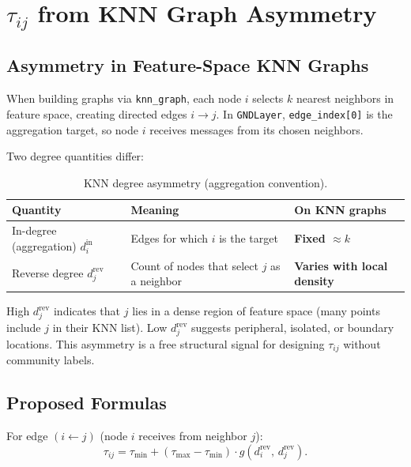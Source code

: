 \documentclass[11pt,a4paper]{report}
\begin{document}
\chapter{\texorpdfstring{$\tau_{ij}$}{tau\_ij} from KNN Graph Asymmetry}

\section{Asymmetry in Feature-Space KNN Graphs}

When building graphs via \texttt{knn\_graph}, each node $i$ selects $k$ nearest neighbors in feature space, creating directed edges $i \to j$. In \texttt{GNDLayer}, \texttt{edge\_index[0]} is the aggregation target, so node $i$ receives messages from its chosen neighbors.

Two degree quantities differ:

\begin{table}[h]
\centering
\caption{KNN degree asymmetry (aggregation convention).}
\begin{tabular}{@{}lll@{}}
\toprule
\textbf{Quantity} & \textbf{Meaning} & \textbf{On KNN graphs} \\
\midrule
In-degree (aggregation) $d^{\mathrm{in}}_i$ & Edges for which $i$ is the target & \textbf{Fixed $\approx k$} \\
Reverse degree $d^{\mathrm{rev}}_j$ & Count of nodes that select $j$ as a neighbor & \textbf{Varies with local density} \\
\bottomrule
\end{tabular}
\end{table}

High $d^{\mathrm{rev}}_j$ indicates that $j$ lies in a dense region of feature space (many points include $j$ in their KNN list). Low $d^{\mathrm{rev}}_j$ suggests peripheral, isolated, or boundary locations. This asymmetry is a free structural signal for designing $\tau_{ij}$ without community labels.

\section{Proposed Formulas}

For edge $(i \leftarrow j)$ (node $i$ receives from neighbor $j$):
\begin{equation}
    \tau_{ij} = \tau_{\min} + (\tau_{\max}-\tau_{\min})\cdot g\!\left(d^{\mathrm{rev}}_i,\, d^{\mathrm{rev}}_j\right).
\end{equation}
\end{document}
